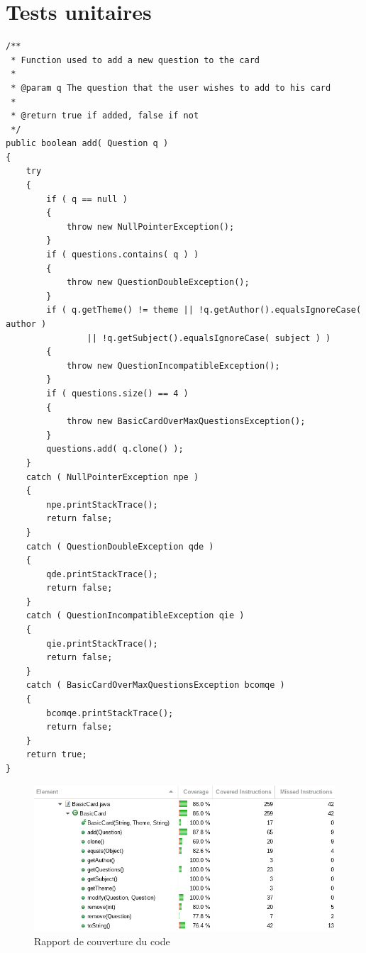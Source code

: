 \newpage
\section{Tests unitaires}

\begin{lstlisting}
/**
 * Function used to add a new question to the card
 * 
 * @param q The question that the user wishes to add to his card
 * 
 * @return true if added, false if not
 */
public boolean add( Question q )
{
    try
    {
        if ( q == null )
        {
            throw new NullPointerException();
        }
        if ( questions.contains( q ) )
        {
            throw new QuestionDoubleException();
        }
        if ( q.getTheme() != theme || !q.getAuthor().equalsIgnoreCase( author )
                || !q.getSubject().equalsIgnoreCase( subject ) )
        {
            throw new QuestionIncompatibleException();
        }
        if ( questions.size() == 4 )
        {
            throw new BasicCardOverMaxQuestionsException();
        }
        questions.add( q.clone() );
    }
    catch ( NullPointerException npe )
    {
        npe.printStackTrace();
        return false;
    }
    catch ( QuestionDoubleException qde )
    {
        qde.printStackTrace();
        return false;
    }
    catch ( QuestionIncompatibleException qie )
    {
        qie.printStackTrace();
        return false;
    }
    catch ( BasicCardOverMaxQuestionsException bcomqe )
    {
        bcomqe.printStackTrace();
        return false;
    }
    return true;
}
\end{lstlisting}

\begin{figure}[h]
	\centering
	\includegraphics[width=\textwidth]{junit_coverage.png}
	\caption{Rapport de couverture du code}
	\label{fig:diag_coverage}
\end{figure}

